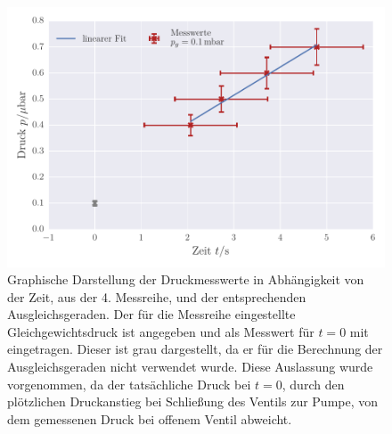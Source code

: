 \begin{figure}[!h]
 \centering
 \includegraphics[scale=0.65]{../Grafiken/Leckrate_Turbo_3.pdf}
 \caption{Graphische Darstellung der Druckmesswerte in Abhängigkeit von der Zeit, aus der 4. Messreihe, und der
 	entsprechenden Ausgleichsgeraden. Der für die Messreihe eingestellte Gleichgewichtsdruck ist angegeben und als Messwert für $t=0$ mit eingetragen. Dieser ist grau dargestellt, da er für die 
 	Berechnung der Ausgleichsgeraden nicht verwendet wurde. Diese Auslassung wurde vorgenommen, da
 	der tatsächliche Druck bei $t=0$, durch den plötzlichen Druckanstieg bei Schließung des Ventils zur Pumpe, von dem
 	gemessenen Druck bei offenem Ventil abweicht.  \label{fig:leckrate_turbo_3}}
 \end{figure} 